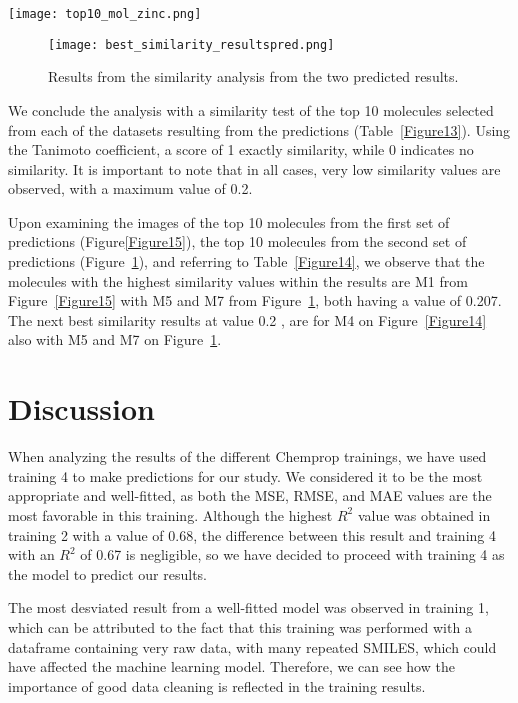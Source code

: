 \documentclass[final,times,twocolumn,article]{elsarticle}
\begin{document}
 \begin{figure*}
    \centering 
     \texttt{[image: top10\_mol\_zinc.png]}	
     \caption{The 10 molecules from the second predicted results with a higher activity value} 
     \label{Figure15}
 \end{figure*}

 \begin{figure}[h]
    \centering 
     \texttt{[image: best\_similarity\_resultspred.png]}	
     \caption{Results from the similarity analysis from the two predicted results.} 
     \label{Figure16}
 \end{figure}

 We conclude the analysis with a similarity test of the top 10 molecules selected from each of the datasets resulting from the predictions (Table~\ref{Figure13}). Using the Tanimoto coefficient, a score of 1 exactly similarity, while 0 indicates no similarity. It is important to note that in all cases, very low similarity values are observed, with a maximum value of 0.2.

 Upon examining the images of the top 10 molecules from the first set of predictions (Figure{\ref{Figure15}}), the top 10 molecules from the second set of predictions (Figure~\ref{Figure16}), and referring to Table~\ref{Figure14}, we observe that the molecules with the highest similarity values within the results are M1 from Figure~\ref{Figure15} with M5 and M7 from Figure~\ref{Figure16}, both having a value of 0.207. The next best similarity results at value 0.2 , are for M4 on Figure~\ref{Figure14} also with M5 and M7 on Figure~\ref{Figure16}. 
 

\section{Discussion}

When analyzing the results of the different Chemprop trainings, we have used training 4 to make predictions for our study. We considered it to be the most appropriate and well-fitted, as both the MSE, RMSE, and MAE values are the most favorable in this training. Although the highest $R^2$ value was obtained in training 2 with a value of 0.68, the difference between this result and training 4 with an $R^2$ of 0.67 is negligible, so we have decided to proceed with training 4 as the model to predict our results.

The most desviated result from a well-fitted model was observed in training 1, which can be attributed to the fact that this training was performed with a dataframe containing very raw data, with many repeated SMILES, which could have affected the machine learning model. Therefore, we can see how the importance of good data cleaning is reflected in the training results.
\end{document}
